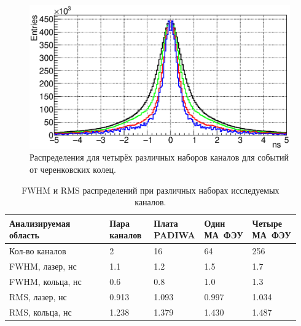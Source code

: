\begin{figure}[H]
\centering
\includegraphics[width=1.0\textwidth]{pictures/25_TimePrecision_evolution_rings_feb2017.eps}
\caption{Распределения для четырёх различных наборов каналов для событий от черенковских колец.}
\label{fig:TimeResEvolutionRings}
\end{figure}

\begin{table}[H]
\caption{FWHM и RMS распределений при различных наборах исследуемых каналов.}
\label{tabl:EvolutionParams}
\begin{tabular}{ | p{0.34\linewidth} | p{0.15\linewidth} | p{0.15\linewidth} | p{0.15\linewidth} | p{0.15\linewidth} | }
	\hline
	Анализируемая область & Пара каналов & Плата PADIWA & Один МА~ФЭУ & Четыре МА~ФЭУ \\
	\hline
	Кол-во каналов & 2 & 16 & 64 & 256 \\
	\hline
	FWHM, лазер, нс & 1.1 & 1.2 & 1.5 & 1.7 \\
	\hline
	FWHM, кольца, нс & 0.6 & 0.8 & 1.0 & 1.3 \\
	\hline
	RMS, лазер, нс & 0.913 & 1.093 & 0.997 & 1.034 \\
	\hline
	RMS, кольца, нс & 1.238 & 1.379 & 1.430 & 1.487 \\
	\hline
\end{tabular}
\end{table}
